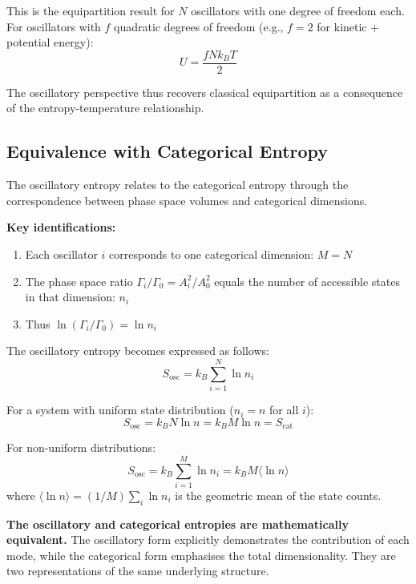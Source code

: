 This is the equipartition result for $N$ oscillators with one degree of freedom each. For oscillators with $f$ quadratic degrees of freedom (e.g., $f=2$ for kinetic + potential energy):
\begin{equation}
U = \frac{f N k_B T}{2}
\end{equation}

The oscillatory perspective thus recovers classical equipartition as a consequence of the entropy-temperature relationship.

\subsection{Equivalence with Categorical Entropy}

The oscillatory entropy relates to the categorical entropy through the correspondence between phase space volumes and categorical dimensions.

\textbf{Key identifications:}
\begin{enumerate}
\item Each oscillator $i$ corresponds to one categorical dimension: $M = N$
\item The phase space ratio $\Gamma_i/\Gamma_0 = A_i^2/A_0^2$ equals the number of accessible states in that dimension: $n_i$
\item Thus $\ln(\Gamma_i/\Gamma_0) = \ln n_i$
\end{enumerate}

The oscillatory entropy becomes expressed as follows:
\begin{equation}
S_{\text{osc}} = k_B \sum_{i=1}^{N} \ln n_i
\end{equation}

For a system with uniform state distribution ($n_i = n$ for all $i$):
\begin{equation}
S_{\text{osc}} = k_B N \ln n = k_B M \ln n = S_{\text{cat}}
\end{equation}

For non-uniform distributions:
\begin{equation}
S_{\text{osc}} = k_B \sum_{i=1}^{M} \ln n_i = k_B M \langle \ln n \rangle
\end{equation}
where $\langle \ln n \rangle = (1/M)\sum_i \ln n_i$ is the geometric mean of the state counts.

\textbf{The oscillatory and categorical entropies are mathematically equivalent.} The oscillatory form explicitly demonstrates the contribution of each mode, while the categorical form emphasises the total dimensionality. They are two representations of the same underlying structure.

